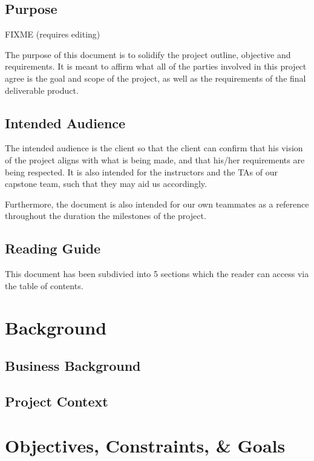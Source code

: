 \documentclass[10pt,letterpaper]{article}
\begin{document}
\subsection{Purpose}
FIXME (requires editing)

The purpose of this document is to solidify the project outline, objective and requirements.
It is meant to affirm what all of the parties involved in this project agree is the goal and scope of the project, as well as the requirements of the final deliverable product.

\subsection{Intended Audience}

The intended audience is the client so that the client can confirm that his vision of the project aligns with what is being made, and that his/her requirements are being respected.
It is also intended for the instructors and the TAs of our capstone team, such that
they may aid us accordingly.

Furthermore, the document is also intended for our own teammates as a reference
throughout the duration the milestones of the project.

\subsection{Reading Guide}

This document has been subdivied into 5 sections which the reader can access via the table of contents.

\section{Background}


\subsection{Business Background}


\subsection{Project Context}


\section{Objectives, Constraints, \& Goals}

\end{document}

